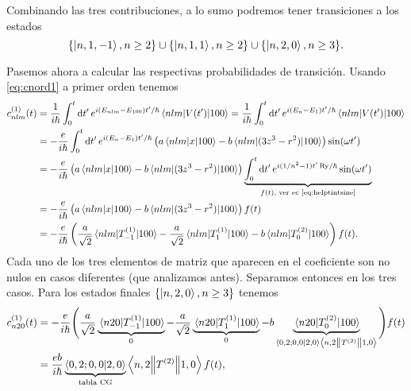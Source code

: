 \documentclass[10pt, a4paper]{article}
\newcommand{\Ry}{\ensuremath{\text{Ry}}}
\numberwithin{equation}{subsection}
\begin{document}
Combinando las tres contribuciones, a lo sumo podremos tener transiciones a los
estados
\begin{equation}
  \set{\ket{n,1,-1}, n\geq2} \cup \set{\ket{n,1,1}, n\geq2} \cup
    \set{\ket{n,2,0}, n\geq3}.
\end{equation}

\bigbreak

Pasemos ahora a calcular las respectivas probabilidades de transición. Usando
\eqref{eq:cnord1} a primer orden tenemos
\begin{align}
  c^{(1)}_{nlm}(t)
  &= \frac{1}{i\hbar} \int_{0}^{t}\dd{t'} e^{i(E_{nlm} - E_{100})t'/\hbar}
    \matrixel{nlm}{V(t')}{100}
  = \frac{1}{i\hbar} \int_{0}^{t}\dd{t'} e^{i(E_{n} - E_{1})t'/\hbar}
    \matrixel{nlm}{V(t')}{100} \nonumber \\
  &= -\frac{e}{i\hbar} \int_{0}^{t}\dd{t'} e^{i(E_{n} - E_{1})t'/\hbar}
    \left(a\matrixel{nlm}{x}{100} -b\matrixel{nlm}{(3z^3 - r^2)}{100}\right)
    \sin(\omega t') \nonumber \\
  &= -\frac{e}{i\hbar} 
    \left(a\matrixel{nlm}{x}{100} -b\matrixel{nlm}{(3z^3 - r^2)}{100}\right)
    \underbrace{\int_{0}^{t}\dd{t'} e^{i(1/n^2 - 1)t'\,\Ry/\hbar}
    \sin(\omega t')}_{f(t) \text{, ver ec \eqref{eq:helptintsine}}} \nonumber
    \\
  &= -\frac{e}{i\hbar} 
    \left(a\matrixel{nlm}{x}{100} -b\matrixel{nlm}{(3z^3 - r^2)}{100}\right)
    f(t) \nonumber \\
  &= -\frac{e}{i\hbar} 
    \left(\frac{a}{\sqrt{2}}\matrixel{nlm}{T^{(1)}_{-1}}{100} -
    \frac{a}{\sqrt{2}}\matrixel{nlm}{T^{(1)}_{1}}{100}
    -b\matrixel{nlm}{T^{(2)}_{0}}{100}\right) f(t). \label{eq:exc:cnlmgen}
\end{align}
Cada uno de los tres elementos de matriz que aparecen en el coeficiente son no
nulos en casos diferentes (que analizamos antes). Separamos entonces en los
tres casos. Para los estados finales $\set{\ket{n,2,0}, n\geq3}$ tenemos
\begin{align}
  c^{(1)}_{n20}(t)
  &= -\frac{e}{i\hbar} 
    \Bigg(\frac{a}{\sqrt{2}} \underbrace{\matrixel{n20}{T^{(1)}_{-1}}{100}}_{0}
    - \frac{a}{\sqrt{2}} \underbrace{\matrixel{n20}{T^{(1)}_{1}}{100}}_{0}
    -b \underbrace{\matrixel{n20}{T^{(2)}_{0}}{100}}_{\braket{0,2;0,0}{2,0}
    \doublebarmel{n,2}{T^{(2)}}{1,0}} \Bigg) f(t) \nonumber \\
  &= \frac{eb}{i\hbar} \underbrace{\braket{0,2;0,0}{2,0}}_{\text{tabla CG}}
    \doublebarmel{n,2}{T^{(2)}}{1,0} f(t),
\end{align}
\end{document}
